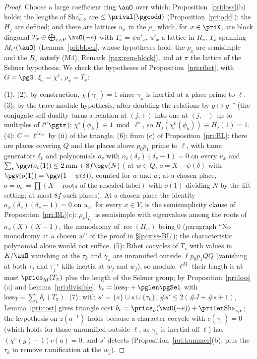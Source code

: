 \documentclass[10pt]{amsart}
\theoremstyle{definition}
\theoremstyle{remark}
\begin{document}
\begin{proof}
Choose a large coefficient ring $\auO$ over which: Proposition~\ref{pri:loss}(b) holds; the lengths
of $\mathrm{Sha}^-_{e,\nu}$ are $\le\prival(\pgcodd)$ (Proposition~\ref{pri:odd}); the $H_j$ are
defined; and there are lattices $u_x$ in the $\rho_x$ which, for $x\in\priX$, are block diagonal $T_x
\oplus\bigoplus_{e<t'}\auO(-e)$ with $T_x=\psi u'_x$, $u'_x$ a lattice in $R_x$, $T_x$ spanning
$M_{r'}(\auO)$ (Lemma~\ref{pri:block}, whose hypotheses hold: the $\rho_x$ are semisimple and the $R_x$ satisfy (M4), Remark~\ref{pax:rem-block}), and at $\pi$ the lattice of the Selmer hypothesis. We check the hypotheses of Proposition~\ref{pri:ribet},
with $G=\pgG$, $\xi_e=\chi^e$, $\rho_x=T_x$:

(1), (2): by construction, $\chi(\gamma_x)=1$ since $\gamma_x$ is inertial at a place prime to
$\ell$. (3): by the trace module hypothesis, after doubling the relations by $g\mapsto g^{-c}$ (the
conjugate self-duality turns a relation at $(j,+)$ into one at $(j,-)$ up to multiples of $\ell^\nu
\pgtr$); $\chi^e(\phi_k)\equiv1\bmod\ell^\nu$, so
$H_j(\chi^e(\phi_k))\equiv H_j(1)=1$. (4): $C=\ell^{hh_0}$ by (ii) of the triangle. (6): from (c) of
Proposition~\ref{pri:BL}: there are places covering $Q$ and the places above $p_0p_1$ prime to
$\ell$, with tame generators $\delta_v$ and polynomials $o_v$ with $o_v(\delta_v)(\delta_v-1)=0$ on
every $u_x$ and $\sum_v\pgv(o_v(1))\le2\,\mathrm{ram}+8f\pgv(N)$ (
at $w\in Q$, $o=X-\psi(\delta)$ with $\pgv(o(1))=\pgv(1-\psi(\delta))$, counted for $w$ and $\overline
w$; at a chosen place, $o=o_w=\prod(X-\text{roots of the rescaled label})$ with $o(1)$ dividing $N$ by
the lift setting; at most $8f$ such places). At a chosen place the identity $o_w(\delta_v)(\delta_v-1)=0$
on $u_x$, for every $x\in Y$, is the semisimplicity clause of Proposition~\ref{pri:BL}(c): $\rho_x|_{I_w}$
is semisimple with eigenvalues among the roots of $o_w(X)(X-1)$, the monodromy of
$\operatorname{rec}(\Pi_w)$ being $0$ (paragraph ``No monodromy at a chosen $w$'' of the proof in
\S\ref{pax:ss-BL}); the characteristic polynomial alone would not suffice. (5): Ribet cocycles of $T_\pi$ with values in $K/\auO$
vanishing at the $\tau_k$ and $\gamma_\pi$ are unramified outside $\ell p_0p_1Q\overline Q$ (vanishing
at both $\tau_j$ and $\tau_j^{-c}$ kills inertia at $w_j$ and $\overline w_j$), so modulo $\ell^M$
their length is at most $\prics_M(T_\pi)$ plus the length of the Selmer group; by
Proposition~\ref{pri:loss}(a) and Lemma~\ref{pri:divisible}, $b_\rho=\mathrm{loss}_T+\pglen\pgSel$ with
$\mathrm{loss}_T=\sum_v\delta_v(T_\pi)$. (7): with $s'=\{a\}\cup s\cup\{\tau_k\}$, $\#s'\le2(\#J+\#s+1)$,
Lemma~\ref{pri:cost} gives triangle cost $b_e=\prics_\nu(\auO(-e))+\prilen\mathrm{Sha}^-_{e,\nu}$; the
hypothesis on $z(a^{-1})$ holds because a character cocycle with $c(\gamma_\pi)=0$ (which holds for
those unramified outside $\ell$, as $\gamma_\pi$ is inertial off $\ell$) has $(\chi^e(g)-1)c(a)=0$;
and $s'$ detects (Proposition~\ref{pri:kummer}(b), plus the $\tau_k$ to remove ramification at the
$w_j$).


\end{proof}
\end{document}
